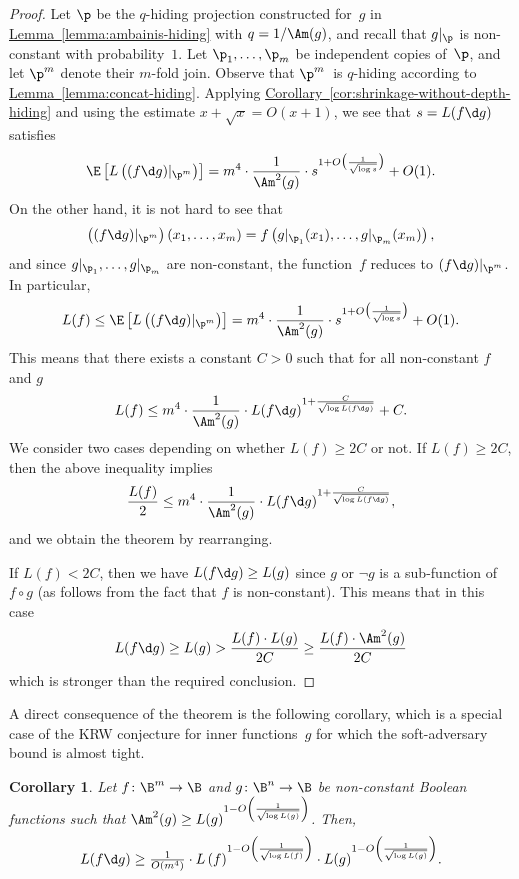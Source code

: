 \documentclass[11pt]{article}
\numberwithin{equation}{section}
\newtheorem{corollary}[theorem]{Corollary}
\theoremstyle{definition}
\theoremstyle{plain}
\newcommand{\expref}[2]{\hyperref[#2]{#1~\ref{#2}}}
\theoremstyle{definition}\newtheorem{notation}[theorem]{Notation}\theoremstyle{plain}
\begin{document}
\begin{proof}
Let $\p$ be the $q$-hiding projection constructed for~$g$ in \expref{Lemma}{lemma:ambainis-hiding}
with $q=1/\Am(g)$, and recall that $g|_{\p}$ is non-constant with
probability~$1$. Let $\p_{1},\ldots,\p_{m}$ be independent copies
of~$\p$, and let $\p^{m}$ denote their $m$-fold join. Observe
that $\p^{m}$~is $q$-hiding according to \expref{Lemma}{lemma:concat-hiding}.
Applying \expref{Corollary}{cor:shrinkage-without-depth-hiding} 
and using the estimate
$x+\sqrt{x}=O(x+1)$, we see that $s=L(f\d g)$ satisfies 
\[
\E\left[L\left((f\d g)|_{\p^{m}}\right)\right]=m^{4}\cdot\frac{1}{\Am^{2}(g)}\cdot s^{1+O\bigl(\frac{1}{\sqrt{\log s}}\bigr)}+O(1).
\]
On the other hand, it is not hard to see that 
\[
\left((f\d g)|_{\p^{m}}\right)(x_{1},\ldots,x_{m})=f\left(g|_{\p_{1}}(x_{1}),\ldots,g|_{\p_{m}}(x_{m})\right),
\]
and since $g|_{\p_{1}},\ldots,g|_{\p_{m}}$ are non-constant, the
function~$f$ reduces to $(f\d g)|_{\p^{m}}$. In particular, 
\[
L(f)\le\E\left[L\left((f\d g)|_{\p^{m}}\right)\right]=m^{4}\cdot\frac{1}{\Am^{2}(g)}\cdot s^{1+O\bigl(\frac{1}{\sqrt{\log s}}\bigr)}+O(1).
\]
This means that there exists a constant $C>0$ such that for all non-constant $f$ and $g$
\[
L(f)\le m^{4}\cdot\frac{1}{\Am^{2}(g)}\cdot L(f\d g)^{1+\frac{C}{\sqrt{\log L(f\d g)}}}+C.\]
We consider two cases depending on whether $L(f)\ge 2C$ or not. 
If $L(f) \ge 2C$, then the above inequality implies
\[\frac{L(f)}{2}\le m^{4}\cdot\frac{1}{\Am^{2}(g)}\cdot L(f\d g)^{1+\frac{C}{\sqrt{\log L(f\d g)}}},\]
 and we obtain the theorem by rearranging. 

If $L(f) < 2C$, then we have $L(f\d g) \ge L(g)$ since $g$ or $\neg g$ is a sub-function of $f\circ g$ (as follows from the fact that $f$ is non-constant).
This means that in this case 
\[L(f\d g) \ge L(g) > \frac{L(f) \cdot L(g)}{2C} \ge \frac{L(f) \cdot \Am^2(g)}{2C}
\]
which is stronger than the required conclusion.
\end{proof}

A direct consequence of the theorem is the following corollary, which
is a special case of the KRW conjecture for inner functions~$g$
for which the soft-adversary bound is almost tight. 
\begin{corollary}
\label{cor:KRW-special-case}Let $f\colon\B^{m}\to\B$ and $g\colon\B^{n}\to\B$
be non-constant Boolean functions such that $\Am^{2}(g)\ge L(g)^{1-O\left(\frac{1}{\sqrt{\log L(g)}}\right)}$.
Then, 
\[
L(f\d g)\ge\tfrac{1}{O(m^{4})}\cdot L\left(f\right)^{1-O\left(\frac{1}{\sqrt{\log L(f)}}\right)}\cdot L(g)^{1-O\left(\frac{1}{\sqrt{\log L(g)}}\right)}.
\]
\end{corollary}
%
%
\end{document}
